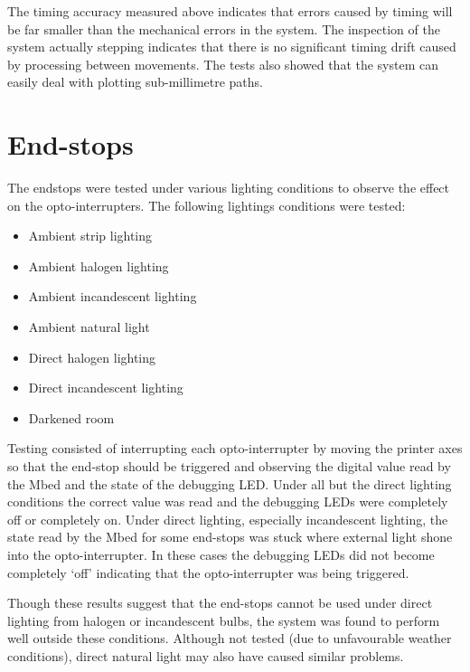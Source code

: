 			
			The timing accuracy measured above indicates that errors caused by timing
			will be far smaller than the mechanical errors in the system. The
			inspection of the system actually stepping indicates that there is no
			significant timing drift caused by processing between movements. The tests
			also showed that the system can easily deal with plotting sub-millimetre
			paths.
	
	\section{End-stops}
		
		The endstops were tested under various lighting conditions to observe the
		effect on the opto-interrupters. The following lightings conditions were
		tested:
		\begin{itemize}
			\item Ambient strip lighting
			\item Ambient halogen lighting
			\item Ambient incandescent lighting
			\item Ambient natural light
			\item Direct halogen lighting
			\item Direct incandescent lighting
			\item Darkened room
		\end{itemize}
		
		Testing consisted of interrupting each opto-interrupter by moving the
		printer axes so that the end-stop should be triggered and observing the
		digital value read by the Mbed and the state of the debugging LED. Under all
		but the direct lighting conditions the correct value was read and the
		debugging LEDs were completely off or completely on. Under direct lighting,
		especially incandescent lighting, the state read by the Mbed for some
		end-stops was stuck where external light shone into the opto-interrupter. In
		these cases the debugging LEDs did not become completely `off' indicating
		that the opto-interrupter was being triggered.
		
		Though these results suggest that the end-stops cannot be used under direct
		lighting from halogen or incandescent bulbs, the system was found to perform
		well outside these conditions. Although not tested (due to unfavourable
		weather conditions), direct natural light may also have caused similar
		problems.
		
		
